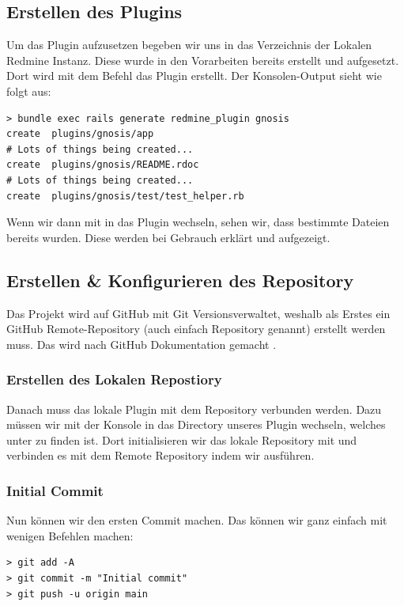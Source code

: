 \subsection{Erstellen des Plugins}
Um das Plugin aufzusetzen begeben wir uns in das Verzeichnis der Lokalen Redmine Instanz. Diese wurde in den
Vorarbeiten bereits erstellt und aufgesetzt. \newline
Dort wird mit dem Befehl  das Plugin erstellt. Der
Konsolen-Output sieht wie folgt aus:
\begin{codebox}[]
  \begin{verbatim}
> bundle exec rails generate redmine_plugin gnosis
create  plugins/gnosis/app
# Lots of things being created...
create  plugins/gnosis/README.rdoc
# Lots of things being created...
create  plugins/gnosis/test/test_helper.rb
  \end{verbatim}
\end{codebox}

Wenn wir dann mit  in das Plugin wechseln, sehen wir, dass bestimmte Dateien
bereits wurden. Diese werden bei Gebrauch erklärt und aufgezeigt.

\subsection{Erstellen \& Konfigurieren des Repository}
Das Projekt wird auf GitHub mit Git Versionsverwaltet, weshalb als Erstes ein GitHub Remote-Repository (auch einfach
Repository genannt) erstellt werden muss. Das wird nach GitHub Dokumentation gemacht \cite{github_create_repo}.

\subsubsection{Erstellen des Lokalen Repostiory}
Danach muss das lokale Plugin mit dem Repository verbunden werden. Dazu müssen wir mit der Konsole in das Directory
unseres Plugin wechseln, welches unter  zu finden ist. \newline
Dort initialisieren wir das lokale Repository mit  und verbinden es mit dem Remote
Repository indem wir  ausführen.

\subsubsection{Initial Commit}
Nun können wir den ersten Commit machen. Das können wir ganz einfach mit wenigen Befehlen machen:
\begin{codebox}[]
  \begin{verbatim}
> git add -A
> git commit -m "Initial commit"
> git push -u origin main
  \end{verbatim}
\end{codebox}

